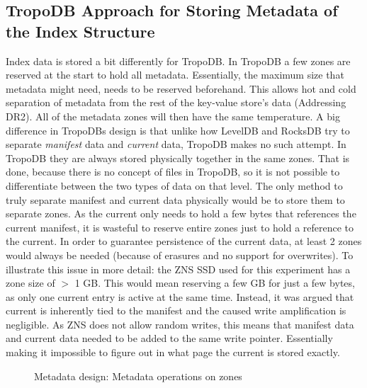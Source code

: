 \subsection{TropoDB Approach for Storing Metadata of the Index Structure}
Index data is stored a bit differently for TropoDB. In TropoDB a few zones are reserved at the start to hold all metadata. Essentially, the maximum size that metadata might need, needs to be reserved beforehand. This allows hot and cold separation of metadata from the rest of the key-value store's data (Addressing DR2). All of the metadata zones will then have the same temperature. A big difference in TropoDBs design is that unlike how LevelDB and RocksDB try to separate \textit{manifest} data and \textit{current} data, TropoDB makes no such attempt.  In TropoDB they are always stored physically together in the same zones. That is done, because there is no concept of files in TropoDB, so it is not possible to differentiate between the two types of data on that level. The only method to truly separate manifest and current data physically would be to store them to separate zones. As the current only needs to hold a few bytes that references the current manifest, it is wasteful to reserve entire zones just to hold a reference to the current. In order to guarantee persistence of the current data, at least 2 zones would always be needed (because of erasures and no support for overwrites). To illustrate this issue in more detail: the ZNS SSD used for this experiment has a zone size of $>$ 1 GB. This would mean reserving a few GB for just a few bytes, as only one current entry is active at the same time. Instead, it was argued that current is inherently tied to the manifest and the caused write amplification is negligible. As ZNS does not allow random writes, this means that manifest data and current data needed to be added to the same write pointer. Essentially making it impossible to figure out in what page the current is stored exactly.

\begin{figure}[h]
\centering
\begin{minipage}{0.75\textwidth}
  \centering
  
\end{minipage}%
\caption{Metadata design: Metadata operations on zones }
\label{fig:metadataworking}
\end{figure}

